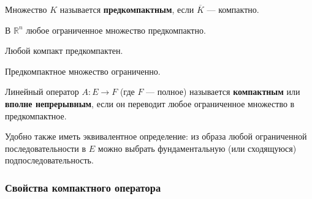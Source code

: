 \documentclass[12pt]{article}
\begin{document}
		\begin{defi}
			Множество $K$ называется \textbf{предкомпактным}, если $\overline{K}$ --- компактно.
		\end{defi}
	
		\example В $\mathbb{R}^n$ любое ограниченное множество предкомпактно.
	
		\example Любой компакт предкомпактен.
	
		\begin{note}
			Предкомпактное множество ограниченно.
		\end{note}
	
		\begin{defi}
			Линейный оператор $A:E \rightarrow F$ (где $F$ --- полное) называется \textbf{компактным} или 
			\textbf{вполне непрерывным}, если он переводит любое ограниченное множество в предкомпактное.
		\end{defi}
	
		Удобно также иметь эквивалентное определение: из образа любой ограниченной последовательности в $E$ можно выбрать 
		фундаментальную (или сходящуюся) подпоследовательность.
	
		\subsubsection{Свойства компактного оператора}
\end{document}
